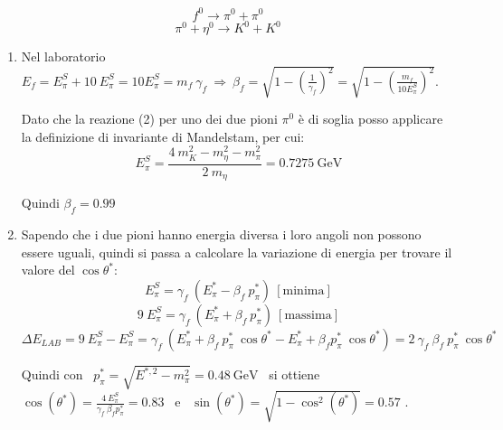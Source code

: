 \documentclass[12pt,twoside,a4]{article}
\begin{document}
 \bigskip



\begin{solution}
	 \begin{equation*}
     f^0 \xrightarrow{} \pi^0 + \pi^0
 \end{equation*}
 \begin{equation*}
     \pi^0 + \eta^0 \xrightarrow{} K^0 + K^0
 \end{equation*}
 
 \bigskip
 
 \begin{enumerate}[label=(\textit{\roman*})]
 	\item Nel laboratorio $E_f = E^S_\pi + 10 \ E^S_\pi = 10 E^S_\pi = m_f \ \gamma_f  \ \Rightarrow \ \beta_f = \sqrt{1-\left(\frac{1}{\gamma_f} \right)^2} = \sqrt{1 - \left(\frac{m_f}{10 E^S_\pi} \right)^2} $. 
 
 \bigskip
 Dato che la reazione (2) per uno dei due pioni $\pi^0$ è di soglia posso applicare la definizione di invariante di Mandelstam, per cui: 
 \begin{equation*}
     E^S_\pi = \frac{4 \ m^2_K - m^2_\eta - m^2_\pi}{2 \ m_\eta} = 0.7275 \ \mathrm{GeV} 
 \end{equation*}
  
  Quindi $\beta_f = 0.99$ 
  
  \item Sapendo che i due pioni hanno energia diversa i loro angoli non possono essere uguali, quindi si passa a calcolare la variazione di energia per trovare il valore del $\cos{\theta^\ast}$: 
 \begin{equation*}
     E^S_\pi = \gamma_f \  (E^\ast_\pi - \beta_f \ p^\ast_\pi)  \  [\text{minima}]    
 \end{equation*}
 \begin{equation*}
      9 \ E^S_\pi = \gamma_f \ (E^\ast_\pi + \beta_f \ p^\ast_\pi)  \  [\text{massima}] 
 \end{equation*}
 \begin{equation*}
     \Delta E_{LAB} = 9 \ E^S_\pi - E^S_\pi = \gamma_f \ (E^\ast_\pi + \beta_f \ p^\ast_\pi \ \cos{\theta^\ast} - E^\ast_\pi + \beta_f p^\ast_\pi \ \cos{\theta^\ast} ) = 2 \ \gamma_f \ \beta_f \ p^\ast_\pi \ \cos{\theta^\ast}         
 \end{equation*}
 
 \bigskip
 Quindi con \ $p^\ast_\pi = \sqrt{E^{\ast,2}-m^2_\pi} = 0.48 \ \mathrm{GeV}$ \  si ottiene \ $\cos{(\theta^\ast)} = \frac{4 \ E^S_\pi}{ \gamma_f \ \beta_f p^\ast_\pi} = 0.83$ \ e \ $ \sin{(\theta^\ast)} = \sqrt{1 - \cos^2{(\theta^\ast)}} = 0.57$ . 
 

\end{enumerate}
\end{solution}
\end{document}

